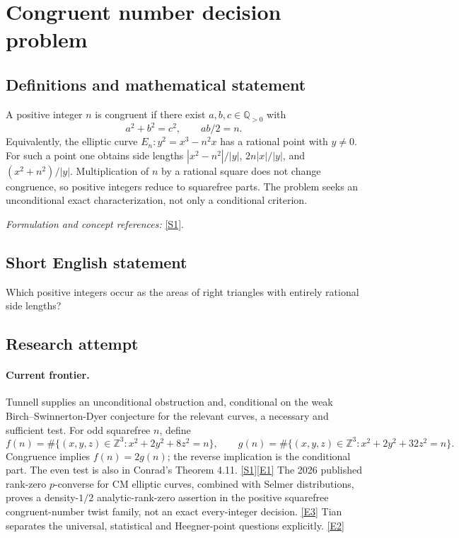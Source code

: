 \documentclass[11pt,a4paper]{article}
\newcommand{\Z}{\mathbb{Z}}
\newcommand{\Q}{\mathbb{Q}}
\newcommand{\sref}[2]{\hyperlink{source:#1:#2}{[S#2]}}
\newcommand{\eref}[2]{\hyperlink{extra:#1:#2}{[E#2]}}
\newif\ifshowcatalogue
\newcommand{\cataloguescope}[1]{\ifshowcatalogue
 \paragraph{Exact scope in the supplied catalogue.}
 \begin{quote}\small #1\end{quote}\fi}
\numberwithin{equation}{section}
\begin{document}
\setcounter{section}{0}
\clearpage
\section*{\texorpdfstring{Congruent number decision problem}{Congruent number decision problem}}\label{statement}
\subsection{Definitions and mathematical statement}
A positive integer $n$ is congruent if there exist $a,b,c\in\Q_{>0}$ with
\[
 a^2+b^2=c^2,\qquad ab/2=n.
\]
Equivalently, the elliptic curve $E_n:y^2=x^3-n^2x$ has a rational point with $y\ne0$. For such a point one obtains side lengths $|x^2-n^2|/|y|$, $2n|x|/|y|$, and $(x^2+n^2)/|y|$. Multiplication of $n$ by a rational square does not change congruence, so positive integers reduce to squarefree parts. The problem seeks an unconditional exact characterization, not only a conditional criterion.
\par\smallskip\textit{Formulation and concept references:} \sref{statement}{1}.
\cataloguescope{Determine exactly which positive integers are congruent numbers, i.e. areas of right triangles with all three sides rational, equivalently for which squarefree n the elliptic curve y\textasciicircum{}2 = x\textasciicircum{}3 - n\textasciicircum{}2 x has a rational point with y != 0.}
\subsection{Short English statement}
Which positive integers occur as the areas of right triangles with entirely rational side lengths?
\subsection{Research attempt}

\paragraph{Current frontier.}
Tunnell supplies an unconditional obstruction and, conditional on the weak
Birch--Swinnerton-Dyer conjecture for the relevant curves, a necessary and
sufficient test. For odd squarefree $n$, define
\[
 f(n)=\#\{(x,y,z)\in\Z^3:x^2+2y^2+8z^2=n\},\qquad
 g(n)=\#\{(x,y,z)\in\Z^3:x^2+2y^2+32z^2=n\}.
\]
Congruence implies $f(n)=2g(n)$; the reverse implication is the conditional
part. The even test is also in Conrad's Theorem 4.11. \sref{statement}{1}\eref{statement}{1}
The 2026 published rank-zero $p$-converse for CM elliptic curves, combined
with Selmer distributions, proves a density-$1/2$ analytic-rank-zero assertion
in the positive squarefree congruent-number twist family, not an exact
every-integer decision. \eref{statement}{3} Tian separates the universal,
statistical and Heegner-point questions explicitly. \eref{statement}{2}
\end{document}
